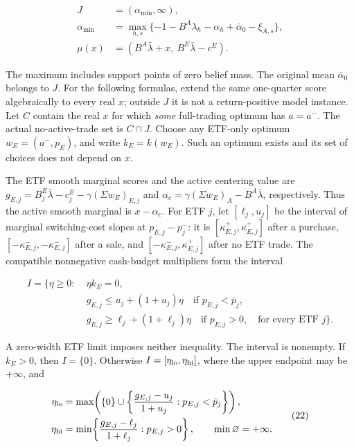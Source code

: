 \documentclass[11pt]{article}
\begin{document}
\begin{equation*}
\begin{aligned}
J&=(\alpha_{\min},\infty),\\
\alpha_{\min}
 &=\max_{h,s}\{-1-B^A\lambda_h-\alpha_h+\bar\alpha_0-\xi_{A,s}\},\\
\mu(x)&=(B^A\bar\lambda+x,\ B^E\bar\lambda-c^E).
\end{aligned}\tag{20}\label{eq:20}
\end{equation*}

The maximum includes support points of zero belief mass. The original
mean \(\bar\alpha_0\) belongs to \(J\). For the following formulas,
extend the same one-quarter score algebraically to every real \(x\);
outside \(J\) it is not a return-positive model instance. Let \(C\)
contain the real \(x\) for which \emph{some} full-trading optimum has
\(a=a^-\). The actual no-active-trade set is \(C\cap J\). Choose any
ETF-only optimum \(w_E=(a^-,p_E)\), and write \(k_E=k(w_E)\).
Such an optimum exists and its set of choices does not depend on \(x\).

The ETF smooth marginal scores and the active centering value are
\(g_{E,j}=B^E_j\bar\lambda-c^E_j-\gamma(\Sigma w_E)_{E,j}\) and
\(\alpha_c=\gamma(\Sigma w_E)_A-B^A\bar\lambda\), respectively. Thus
the active smooth marginal is \(x-\alpha_c\). For ETF \(j\), let
\([\ell_j,u_j]\) be the interval of marginal switching-cost slopes at
\(p_{E,j}-p^-_j\): it is
\([\kappa^+_{E,j},\kappa^+_{E,j}]\) after a purchase,
\([-\kappa^-_{E,j},-\kappa^-_{E,j}]\) after a sale, and
\([-\kappa^-_{E,j},\kappa^+_{E,j}]\) after no ETF trade.
The compatible nonnegative cash-budget multipliers form the interval

\begin{equation*}
\begin{aligned}
I=\{\eta\geq0:\;&\eta k_E=0,\\
&g_{E,j}\leq u_j+(1+u_j)\eta
       \quad\text{if }p_{E,j}<\bar p_j,\\
&g_{E,j}\geq\ell_j+(1+\ell_j)\eta
       \quad\text{if }p_{E,j}>0,\quad\text{for every ETF }j\}.
\end{aligned}\tag{21}\label{eq:21}
\end{equation*}

A zero-width ETF limit imposes neither inequality. The interval is
nonempty. If \(k_E>0\), then \(I=\{0\}\). Otherwise
\(I=[\eta_{\rm lo},\eta_{\rm hi}]\), where the upper endpoint may be
\(+\infty\), and

\begin{equation*}
\begin{aligned}
\eta_{\rm lo}
 &=\max\!\left(\{0\}\cup
   \left\{\frac{g_{E,j}-u_j}{1+u_j}:p_{E,j}<\bar p_j\right\}\right),\\
\eta_{\rm hi}
 &=\min\!\left\{
   \frac{g_{E,j}-\ell_j}{1+\ell_j}:p_{E,j}>0\right\},
 \qquad\min\varnothing=+\infty .
\end{aligned}\tag{22}\label{eq:22}
\end{equation*}
\end{document}
